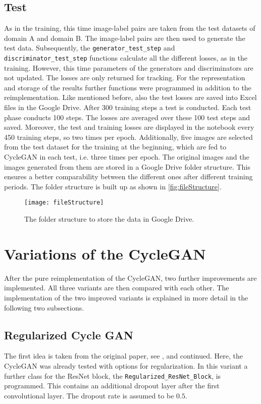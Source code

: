 \documentclass[fleqn,10pt]{SelfArx} %
\begin{document}
\subsection{Test}
As in the training, this time image-label pairs are taken from the test datasets of domain A and domain B. The image-label pairs are then used to generate the test data. Subsequently, the \texttt{generator\_test\_step} and \texttt{discriminator\_test\_step} functions calculate all the different losses, as in the training. However, this time parameters of the generators and discriminators are not updated. The losses are only returned for tracking.
For the representation and storage of the results further functions were programmed in addition to the reimplementation. Like mentioned before, also the test losses are saved into Excel files in the Google Drive. After 300 training steps a test is conducted. Each test phase conducts 100 steps. The losses are averaged over these 100 test steps and saved. Moreover, the test and training losses are displayed in the notebook every 450 training steps, so two times per epoch. Additionally, five images are selected from the test dataset for the training at the beginning, which are fed to Cycle\ac{GAN} in each test, i.e. three times per epoch. The original images and the images generated from them are stored in a Google Drive folder structure. This ensures a better comparability between the different ones after different training periods. The folder structure is built up as shown in \autoref{fig:fileStructure}.

\begin{figure}[htb] 
	\centering 
	\texttt{[image: fileStructure]}
	\caption{The folder structure to store the data in Google Drive.}
	\label{fig:fileStructure}
\end{figure}

\section{Variations of the Cycle\ac{GAN}}
After the pure reimplementation of the Cycle\ac{GAN}, two further improvements are implemented. All three variants are then compared with each other. The implementation of the two improved variants is explained in more detail in the following two subsections.

\subsection{Regularized Cycle GAN}
The first idea is taken from the original paper, see \cite{image-to-image-ccan}, and continued. Here, the Cycle\ac{GAN} was already tested with options for regularization. In this variant a further class for the \ac{ResNet} block, the \texttt{Regularized\_ResNet\_Block}, is programmed. This contains an additional dropout layer after the first convolutional layer. The dropout rate is assumed to be $0.5$.
\end{document}
